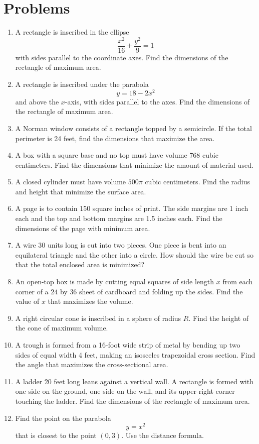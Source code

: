 \documentclass[12pt]{article}
\begin{document}
\section*{Problems}
\begin{enumerate}[leftmargin=*, itemsep=1em, topsep=0.8em]
  \item A rectangle is inscribed in the ellipse
  \[
  \frac{x^2}{16}+\frac{y^2}{9}=1
  \]
  with sides parallel to the coordinate axes. Find the dimensions of the rectangle of maximum area.

  \item A rectangle is inscribed under the parabola
  \[
  y=18-2x^2
  \]
  and above the $x$-axis, with sides parallel to the axes. Find the dimensions of the rectangle of maximum area.

  \item A Norman window consists of a rectangle topped by a semicircle. If the total perimeter is 24 feet, find the dimensions that maximize the area.

  \item A box with a square base and no top must have volume 768 cubic centimeters. Find the dimensions that minimize the amount of material used.

  \item A closed cylinder must have volume $500\pi$ cubic centimeters. Find the radius and height that minimize the surface area.

  \item A page is to contain 150 square inches of print. The side margins are 1 inch each and the top and bottom margins are 1.5 inches each. Find the dimensions of the page with minimum area.

  \item A wire 30 units long is cut into two pieces. One piece is bent into an equilateral triangle and the other into a circle. How should the wire be cut so that the total enclosed area is minimized?

  \item An open-top box is made by cutting equal squares of side length $x$ from each corner of a $24$ by $36$ sheet of cardboard and folding up the sides. Find the value of $x$ that maximizes the volume.

  \item A right circular cone is inscribed in a sphere of radius $R$. Find the height of the cone of maximum volume.

  \item A trough is formed from a 16-foot wide strip of metal by bending up two sides of equal width 4 feet, making an isosceles trapezoidal cross section. Find the angle that maximizes the cross-sectional area.

  \item A ladder 20 feet long leans against a vertical wall. A rectangle is formed with one side on the ground, one side on the wall, and its upper-right corner touching the ladder. Find the dimensions of the rectangle of maximum area.

  \item Find the point on the parabola
  \[
  y=x^2
  \]
  that is closest to the point $(0,3)$. Use the distance formula.
\end{enumerate}
\end{document}
